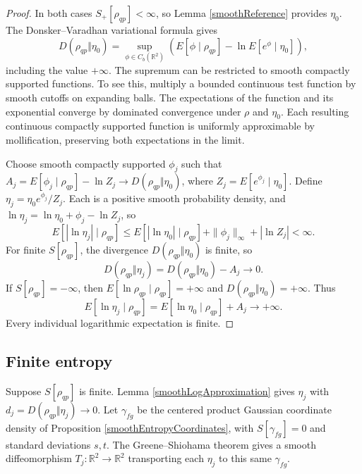 \documentclass{techbrief}
\begin{document}
\begin{proof}
	In both cases $S_+[\rho_{qp}]<\infty$, so Lemma \ref{smoothReference} provides $\eta_0$. The Donsker--Varadhan variational formula \cite[Theorem 3.3]{Rezakhanlou} gives
	\begin{equation*}
		D(\rho_{qp}\Vert\eta_0)
		=\sup_{\phi\in C_b(\mathbb{R}^2)}
		\left(E[\phi\mid\rho_{qp}]-\ln E[e^\phi\mid\eta_0]\right),
	\end{equation*}
	including the value $+\infty$. The supremum can be restricted to smooth compactly supported functions. To see this, multiply a bounded continuous test function by smooth cutoffs on expanding balls. The expectations of the function and its exponential converge by dominated convergence under $\rho$ and $\eta_0$. Each resulting continuous compactly supported function is uniformly approximable by mollification, preserving both expectations in the limit.

	Choose smooth compactly supported $\phi_j$ such that $A_j=E[\phi_j\mid\rho_{qp}]-\ln Z_j\to D(\rho_{qp}\Vert\eta_0)$, where $Z_j=E[e^{\phi_j}\mid\eta_0]$. Define $\eta_j=\eta_0e^{\phi_j}/Z_j$. Each is a positive smooth probability density, and $\ln\eta_j=\ln\eta_0+\phi_j-\ln Z_j$, so
	\begin{equation*}
		E[|\ln\eta_j|\mid\rho_{qp}]\leq E[|\ln\eta_0|\mid\rho_{qp}]+\|\phi_j\|_\infty+|\ln Z_j|<\infty.
	\end{equation*}
	For finite $S[\rho_{qp}]$, the divergence $D(\rho_{qp}\Vert\eta_0)$ is finite, so
	\begin{equation*}
		D(\rho_{qp}\Vert\eta_j)=D(\rho_{qp}\Vert\eta_0)-A_j\longrightarrow0.
	\end{equation*}
	If $S[\rho_{qp}]=-\infty$, then $E[\ln\rho_{qp}\mid\rho_{qp}]=+\infty$ and $D(\rho_{qp}\Vert\eta_0)=+\infty$. Thus
	\begin{equation*}
		E[\ln\eta_j\mid\rho_{qp}]
		=E[\ln\eta_0\mid\rho_{qp}]+A_j\longrightarrow+\infty.
	\end{equation*}
	Every individual logarithmic expectation is finite.
\end{proof}

\subsection{Finite entropy}

Suppose $S[\rho_{qp}]$ is finite. Lemma \ref{smoothLogApproximation} gives $\eta_j$ with $d_j=D(\rho_{qp}\Vert\eta_j)\to0$. Let $\gamma_{fg}$ be the centered product Gaussian coordinate density of Proposition \ref{smoothEntropyCoordinates}, with $S[\gamma_{fg}]=0$ and standard deviations $s,t$. The Greene--Shiohama theorem gives a smooth diffeomorphism $T_j:\mathbb{R}^2\to\mathbb{R}^2$ transporting each $\eta_j$ to this same $\gamma_{fg}$.
\end{document}
